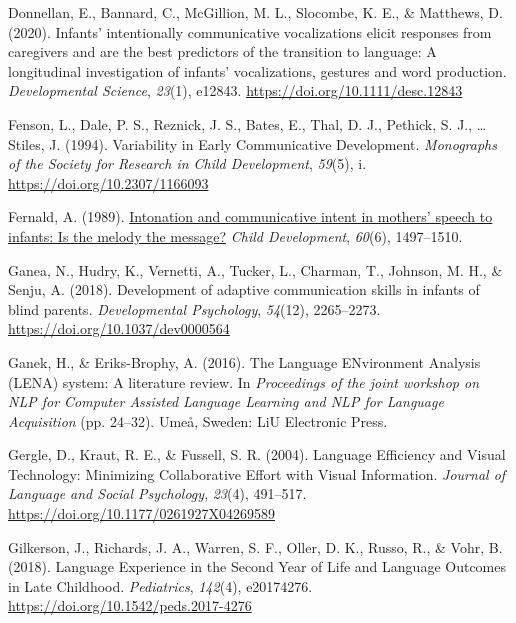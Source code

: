 \documentclass[
  man]{apa6}
\newlength{\cslhangindent}
\newlength{\cslentryspacingunit} %
\newenvironment{CSLReferences}[2] %
 {%
  \setlength{\parindent}{0pt}
  \ifodd #1
  \let\oldpar\par
  \def\par{\hangindent=\cslhangindent\oldpar}
  \fi
  \setlength{\parskip}{#2\cslentryspacingunit}
 }%
 {}
\begin{document}
\begin{CSLReferences}{1}{0}
\leavevmode{}%
Donnellan, E., Bannard, C., McGillion, M. L., Slocombe, K. E., \& Matthews, D. (2020). Infants' intentionally communicative vocalizations elicit responses from caregivers and are the best predictors of the transition to language: {A} longitudinal investigation of infants' vocalizations, gestures and word production. \emph{Developmental Science}, \emph{23}(1), e12843. \url{https://doi.org/10.1111/desc.12843}

\leavevmode{}%
Fenson, L., Dale, P. S., Reznick, J. S., Bates, E., Thal, D. J., Pethick, S. J., \ldots{} Stiles, J. (1994). Variability in {Early Communicative Development}. \emph{Monographs of the Society for Research in Child Development}, \emph{59}(5), i. \url{https://doi.org/10.2307/1166093}

\leavevmode{}%
Fernald, A. (1989). \href{https://www.ncbi.nlm.nih.gov/pubmed/2612255}{Intonation and communicative intent in mothers' speech to infants: Is the melody the message?} \emph{Child Development}, \emph{60}(6), 1497--1510.

\leavevmode{}%
Ganea, N., Hudry, K., Vernetti, A., Tucker, L., Charman, T., Johnson, M. H., \& Senju, A. (2018). Development of adaptive communication skills in infants of blind parents. \emph{Developmental Psychology}, \emph{54}(12), 2265--2273. \url{https://doi.org/10.1037/dev0000564}

\leavevmode{}%
Ganek, H., \& Eriks-Brophy, A. (2016). The {Language ENvironment Analysis} ({LENA}) system: {A} literature review. In \emph{Proceedings of the joint workshop on {NLP} for {Computer Assisted Language Learning} and {NLP} for {Language Acquisition}} (pp. 24--32). {Umeå, Sweden}: {LiU Electronic Press}.

\leavevmode{}%
Gergle, D., Kraut, R. E., \& Fussell, S. R. (2004). Language {Efficiency} and {Visual Technology}: {Minimizing Collaborative Effort} with {Visual Information}. \emph{Journal of Language and Social Psychology}, \emph{23}(4), 491--517. \url{https://doi.org/10.1177/0261927X04269589}

\leavevmode{}%
Gilkerson, J., Richards, J. A., Warren, S. F., Oller, D. K., Russo, R., \& Vohr, B. (2018). Language {Experience} in the {Second Year} of {Life} and {Language Outcomes} in {Late Childhood}. \emph{Pediatrics}, \emph{142}(4), e20174276. \url{https://doi.org/10.1542/peds.2017-4276}


\end{CSLReferences}
\end{document}
